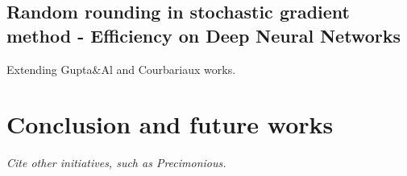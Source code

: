 \documentclass[a4paper,11pt]{article}
\let\cite=\supercite
\begin{document}
\subsection{Random rounding in stochastic gradient method - Efficiency on Deep Neural Networks}
Extending Gupta\&Al\cite{Gupta2015} and Courbariaux\cite{Courbariaux2014} works.

\newpage
\section{Conclusion and future works}
\emph{Cite other initiatives, such as Precimonious\cite{Rubio-Gonzalez2013}.}

\newpage
\printbibliography
\end{document}
